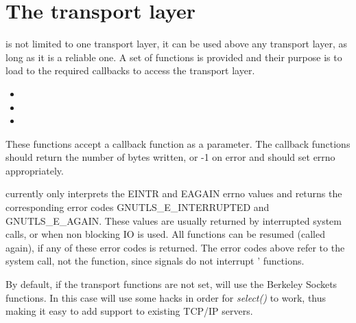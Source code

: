 \section{The transport layer}
\par
\tls{} is not limited to one transport layer, it
can be used above any transport layer, as long as it is a reliable
one. A set of functions is provided and their purpose is to load
to \gnutls{} the required callbacks to access the transport layer.

\begin{itemize}
\item {}
\item {}
\item {}
\end{itemize}

These functions accept a callback function as a parameter.
The callback functions should return the number of bytes written, or -1 on 
error and should set errno appropriately.
\par
\gnutls{} currently only interprets the EINTR and EAGAIN errno values and
returns the corresponding \gnutls{} error codes GNUTLS\_E\_INTERRUPTED and
GNUTLS\_E\_AGAIN.
These values are usually returned by interrupted system calls, or 
when non blocking IO is used. All \gnutls{} functions
can be resumed (called again), if any of these error codes is returned.
The error codes above refer to the system call, not the \gnutls{} function,
since signals do not interrupt \gnutls{}' functions.

\par
By default, if the transport functions are not set, \gnutls{} will use
the Berkeley Sockets functions. In this case
\gnutls{} will use some hacks in order for \emph{select()} to work, thus
making it easy to add \tls{} support to existing TCP/IP servers.
